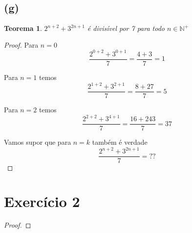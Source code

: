 \documentclass{article}
\begin{document}
\subsection*{(g)}
\newtheorem{teo7}{Teorema}
\begin{teo7}
	$2^{n+2} + 3^{2n+1}$ é divisível por 7 para todo $n \in \mathbb{N^+}$
\end{teo7}
\begin{proof}
	Para $n = 0$
	\begin{equation}
		\dfrac{2^{0 + 2} + 3^{0 + 1}}{7} = \dfrac{4 + 3}{7} = 1
	\end{equation}

	Para $n = 1$ temos
	\begin{equation}
		\dfrac{2^{1+2}+3^{2+1}}{7} = \dfrac{8 + 27}{7} = 5 
	\end{equation}

	Para $n = 2$ temos
	\begin{equation}
		\dfrac{2^{2+2}+3^{4+1}}{7} = \dfrac{16 + 243}{7} = 37
	\end{equation}

	Vamos supor que para $n = k$ também é verdade
	\begin{equation}
		\dfrac{2^{n+2} + 3^{2n+1}}{7} = ??
	\end{equation}
\end{proof}

\section{Exercício 2}
\begin{proof}

\end{proof}
\end{document}
